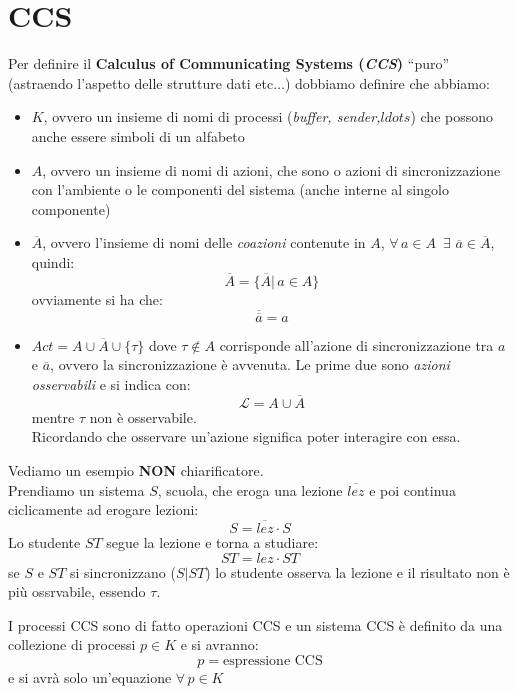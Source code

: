 \documentclass[a4paper,12pt, oneside]{book}
\begin{document}
\section{CCS}
\begin{definizione}
  Per definire il \textbf{Calculus of Communicating Systems (\textit{CCS})}
  ``puro'' (astraendo l'aspetto delle strutture dati etc$\ldots$) dobbiamo
  definire che abbiamo: 
  \begin{itemize}
    \item $K$, ovvero un insieme di nomi di processi (\textit{buffer,
      sender,$ldots$}) che possono anche essere simboli di un alfabeto
    \item $A$, ovvero un insieme di nomi di azioni, che sono o azioni di
    sincronizzazione con l'ambiente o le componenti del sistema (anche interne
    al singolo componente)
    \item $\overline{A}$, ovvero l'insieme di nomi delle \textit{coazioni}
    contenute in $A$, $\forall\, a\in A\,\,\,\exists\,\, \overline{a}\in
    \overline{A}$, quindi:
    \[\overline{A}=\{\overline{A}|\,a\in A\}\]
    ovviamente si ha che:
    \[\overline{\overline{a}}=a\]
    \item $Act=A\cup \overline{A}\cup \{\tau\}$ dove $\tau\not\in A$ corrisponde
    all'azione di sincronizzazione tra $a$ e $\overline{a}$, ovvero la
    sincronizzazione è avvenuta. Le prime due sono \textit{azioni osservabili} e
    si indica con:
    \[\mathcal{L}=A\cup \overline{A}\]
    mentre $\tau$ non è osservabile.\\
    Ricordando che osservare un'azione significa poter interagire con essa.
  \end{itemize}
\end{definizione}
\begin{esempio}
  Vediamo un esempio \textbf{NON} chiarificatore.\\
  Prendiamo un sistema $S$, scuola, che eroga una lezione $\overline{lez}$ e poi
  continua ciclicamente ad erogare lezioni:
  \[S=\overline{lez}\cdot S\]
  Lo studente $ST$ segue la lezione e torna a studiare:
  \[ST=lez\cdot ST\] 
  se $S$ e $ST$ si sincronizzano ($S|ST$) lo studente osserva la lezione e il
  risultato non è più ossrvabile, essendo $\tau$.
\end{esempio}
\begin{definizione}
  I processi CCS sono di fatto operazioni CCS e un sistema CCS è definito da una
  collezione di processi $p\in K$ e si avranno:
  \[p=\mbox{espressione CCS}\]
  e si avrà solo un'equazione $\forall\,p\in K$
\end{definizione}
\end{document}
